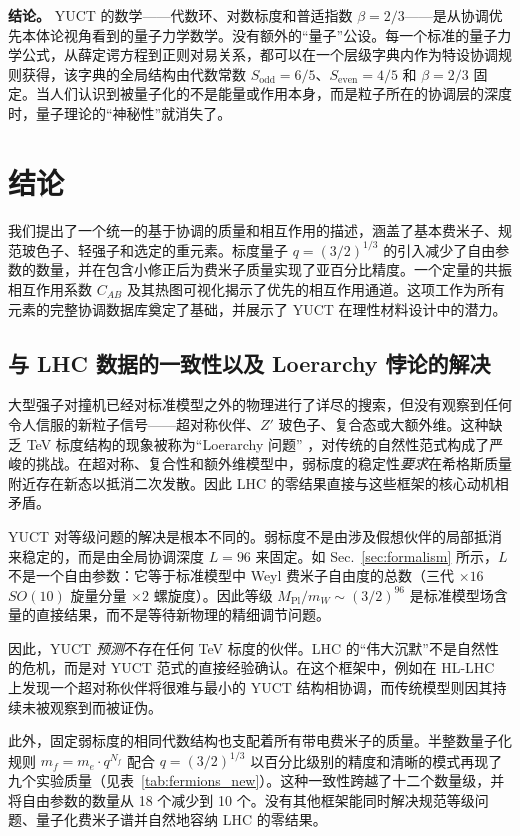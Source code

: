 \documentclass[11pt,a4paper]{article}
\begin{document}
	\medskip
	\noindent
	\textbf{结论。} YUCT 的数学——代数环、对数标度和普适指数 $\beta=2/3$——是从协调优先本体论视角看到的量子力学数学。没有额外的“量子”公设。每一个标准的量子力学公式，从薛定谔方程到正则对易关系，都可以在一个层级字典内作为特设协调规则获得，该字典的全局结构由代数常数 $S_{\mathrm{odd}}=6/5$、$S_{\mathrm{even}}=4/5$ 和 $\beta=2/3$ 固定。当人们认识到被量子化的不是能量或作用本身，而是粒子所在的协调层的深度时，量子理论的“神秘性”就消失了。
	
	\section{结论}
	\label{sec:conclusion}
	
	我们提出了一个统一的基于协调的质量和相互作用的描述，涵盖了基本费米子、规范玻色子、轻强子和选定的重元素。标度量子 \(q = (3/2)^{1/3}\) 的引入减少了自由参数的数量，并在包含小修正后为费米子质量实现了亚百分比精度。一个定量的共振相互作用系数 \(C_{AB}\) 及其热图可视化揭示了优先的相互作用通道。这项工作为所有元素的完整协调数据库奠定了基础，并展示了 YUCT 在理性材料设计中的潜力。
	
	\subsection{与 LHC 数据的一致性以及 Loerarchy 悖论的解决}
	
	大型强子对撞机已经对标准模型之外的物理进行了详尽的搜索，但没有观察到任何令人信服的新粒子信号——超对称伙伴、\(Z'\) 玻色子、复合态或大额外维。这种缺乏 TeV 标度结构的现象被称为“Loerarchy 问题” \cite{Koren2020}，对传统的自然性范式构成了严峻的挑战。在超对称、复合性和额外维模型中，弱标度的稳定性\textit{要求}在希格斯质量附近存在新态以抵消二次发散。因此 LHC 的零结果直接与这些框架的核心动机相矛盾。
	
	YUCT 对等级问题的解决是根本不同的。弱标度不是由涉及假想伙伴的局部抵消来稳定的，而是由全局协调深度 $L=96$ 来固定。如 Sec.~\ref{sec:formalism} 所示，$L$ 不是一个自由参数：它等于标准模型中 Weyl 费米子自由度的总数（三代 $\times 16$ $SO(10)$ 旋量分量 $\times 2$ 螺旋度）。因此等级 $M_{\mathrm{Pl}}/m_W \sim (3/2)^{96}$ 是标准模型场含量的直接结果，而不是等待新物理的精细调节问题。
	
	因此，YUCT \emph{预测}不存在任何 TeV 标度的伙伴。LHC 的“伟大沉默”不是自然性的危机，而是对 YUCT 范式的直接经验确认。在这个框架中，例如在 HL-LHC 上发现一个超对称伙伴将很难与最小的 YUCT 结构相协调，而传统模型则因其持续未被观察到而被证伪。
	
	此外，固定弱标度的相同代数结构也支配着所有带电费米子的质量。半整数量子化规则 $m_f = m_e \cdot q^{N_f}$ 配合 $q = (3/2)^{1/3}$ 以百分比级别的精度和清晰的模式再现了九个实验质量（见表~\ref{tab:fermions_new}）。这种一致性跨越了十二个数量级，并将自由参数的数量从 18 个减少到 10 个。没有其他框架能同时解决规范等级问题、量子化费米子谱并自然地容纳 LHC 的零结果。
	
\end{document}
